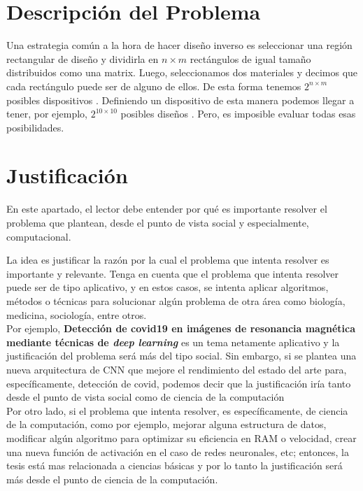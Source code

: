 \section{Descripción del  Problema}

Una estrategia común a la hora de hacer diseño inverso es seleccionar una región rectangular de diseño y dividirla en $n \times m$ rectángulos
de igual tamaño distribuidos como una matrix. 
Luego, seleccionamos dos materiales y decimos que cada rectángulo puede ser de alguno de ellos. 
De esta forma tenemos $2^{n \times m}$ posibles dispositivos \cite{Su2020}. 
Definiendo un dispositivo de esta manera podemos llegar a tener, por ejemplo, $2^{10 \times 10}$ posibles diseños \cite{Malheiros-Silveira2020}.
Pero, es imposible evaluar todas esas posibilidades.

\section{Justificación}
En este apartado, el lector debe entender por qué es importante resolver el problema que plantean, desde el punto de vista social y especialmente, computacional. 

La idea es  justificar la razón por la cual  el problema que intenta resolver es importante y relevante. 
Tenga en cuenta que el problema que intenta resolver puede ser de tipo aplicativo, y  en estos casos, se intenta aplicar algoritmos, métodos o técnicas para solucionar algún problema de otra área como
biología, medicina, sociología, entre otros. \\

Por ejemplo, \textbf{Detección de covid19 en imágenes de resonancia magnética   mediante técnicas de \textit{deep learning}} es un tema netamente aplicativo y la justificación del problema será  más del tipo social. Sin embargo, si se plantea una nueva arquitectura de CNN que mejore el rendimiento del estado del arte para, específicamente, detección de covid, podemos decir que la justificación iría tanto desde el punto de vista social como de ciencia de la computación \\


Por otro lado, si el problema que intenta resolver, es específicamente, de ciencia de la computación, como por ejemplo, mejorar alguna estructura de datos, modificar algún algoritmo para optimizar su eficiencia en RAM o velocidad, crear una nueva función de activación en el caso de redes neuronales, etc; entonces, la tesis está mas relacionada a ciencias básicas y por lo tanto la justificación será más desde el punto de ciencia de la computación.  \\

